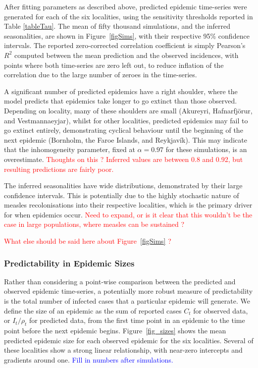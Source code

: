 \documentclass[10pt]{article}
\begin{document}
After fitting parameters as described above, predicted epidemic time-series were generated for each of the six localities, using the sensitivity thresholds reported in Table \ref{tableTau}. The mean of fifty thousand simulations, and the inferred seasonalities, are shown in Figure~\ref{figSims}, with their respective 95\% confidence intervals. The reported zero-corrected correlation coefficient is simply Pearson's $R^2$ computed between the mean prediction and the observed incidences, with points where both time-series are zero left out, to reduce inflation of the correlation due to the large number of zeroes in the time-series. 





A significant number of predicted epidemics have a right shoulder, where the model predicts that epidemics take longer to go extinct than those observed. Depending on locality, many of these shoulders are small (Akureyri, Hafnarfj\"{o}r\dh{}ur, and Vestmannaeyjar), whilst for other localities, predicted epidemics may fail to go extinct entirely, demonstrating cyclical behaviour until the beginning of the next epidemic (Bornholm, the Faroe Islands, and Reykjav\'{i}k). This may indicate that the inhomogeneity parameter, fixed at $\alpha=0.97$ for these simulations, is an overestimate. \textcolor{red}{Thoughts on this ? Inferred values are between 0.8 and 0.92, but resulting predictions are fairly poor.}


The inferred seasonalities have wide distributions, demonstrated by their large confidence intervals. This is potentially due to the highly stochastic nature of measles recolonisations into their respective localities, which is the primary driver for when epidemics occur. \textcolor{red}{Need to expand, or is it clear that this wouldn't be the case in large populations, where measles can be sustained ?}

\textcolor{red}{What else should be said here about Figure~\ref{figSims} ?}





\subsubsection*{Predictability in Epidemic Sizes}

Rather than considering a point-wise comparison between the predicted and observed epidemic time-series, a potentially more robust measure of predictability is the total number of infected cases that a particular epidemic will generate. We define the size of an epidemic as the sum of reported cases $C_t$ for observed data, or $I_t / \rho_t$ for predicted data, from the first time point in an epidemic to the time point before the next epidemic begins. Figure~\ref{fig_sizes} shows the mean predicted epidemic size for each observed epidemic for the six localities. Several of these localities show a strong linear relationship, with near-zero intercepts and gradients around one. \textcolor{blue}{Fill in numbers after simulations.}
\end{document}
